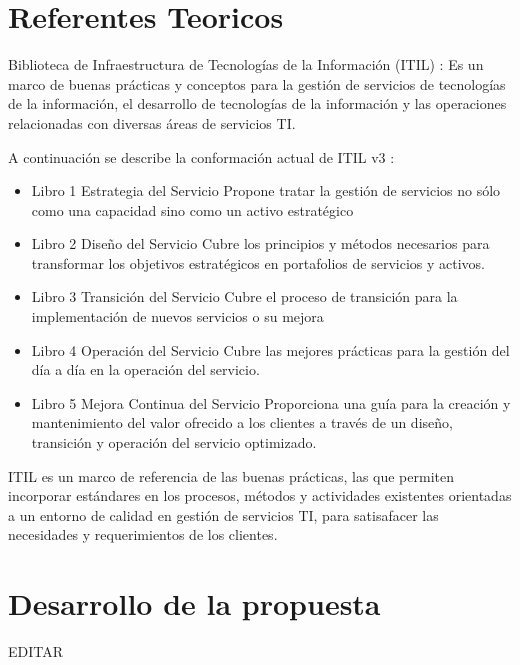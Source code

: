 \documentclass[preprint,12pt]{elsarticle}
\begin{document}
\section{Referentes Teoricos}
Biblioteca de Infraestructura de Tecnologías de la Información (ITIL) : Es un marco de buenas prácticas y conceptos para la gestión de servicios de tecnologías de la información, el desarrollo de tecnologías de la información y las operaciones relacionadas con diversas áreas de servicios TI.

A continuación se describe la conformación actual de ITIL v3 :
\begin{itemize}
\item Libro 1  Estrategia del Servicio 
Propone tratar la gestión de servicios no sólo como una capacidad sino como un activo estratégico
\item Libro 2 Diseño del Servicio
Cubre los principios y métodos necesarios para transformar los objetivos estratégicos en portafolios de servicios y activos.
\item Libro 3 Transición del Servicio
Cubre el proceso de transición para la implementación de nuevos servicios o su mejora
\item Libro 4 Operación del Servicio
Cubre las mejores prácticas para la gestión del día a día en la operación del servicio.
\item Libro 5 Mejora Continua del Servicio
Proporciona una guía para la creación y mantenimiento del valor ofrecido a los clientes a través de un diseño, transición y operación del servicio optimizado.
\end{itemize}
ITIL es un marco de referencia de las buenas prácticas, las que permiten incorporar estándares en los procesos, métodos y actividades existentes orientadas a un entorno de calidad en gestión de servicios TI, para satisafacer las necesidades y requerimientos de los clientes.




\section{Desarrollo de la propuesta}

EDITAR\\
\end{document}

